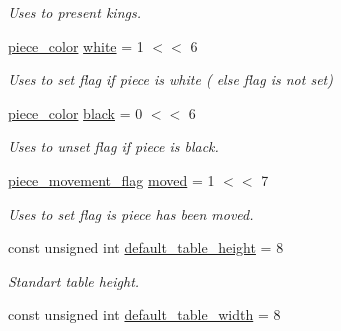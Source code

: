 \begin{DoxyCompactItemize}
\begin{DoxyCompactList}\small\item\em Uses to present kings. \item\end{DoxyCompactList}\item 
\hypertarget{namespaceChEngn_aa3212b290980eb5db7f91e88f8803a9c}{
\hyperlink{namespaceChEngn_a9c81426c0134a97288a226c122daf62f}{piece\_\-color} \hyperlink{namespaceChEngn_aa3212b290980eb5db7f91e88f8803a9c}{white} = 1 $<$$<$ 6}
\label{namespaceChEngn_aa3212b290980eb5db7f91e88f8803a9c}

\begin{DoxyCompactList}\small\item\em Uses to set flag if piece is white ( else flag is not set) \item\end{DoxyCompactList}\item 
\hypertarget{namespaceChEngn_aa2bfc6fe87969d3e28eecbb682e802c8}{
\hyperlink{namespaceChEngn_a9c81426c0134a97288a226c122daf62f}{piece\_\-color} \hyperlink{namespaceChEngn_aa2bfc6fe87969d3e28eecbb682e802c8}{black} = 0 $<$$<$ 6}
\label{namespaceChEngn_aa2bfc6fe87969d3e28eecbb682e802c8}

\begin{DoxyCompactList}\small\item\em Uses to unset flag if piece is black. \item\end{DoxyCompactList}\item 
\hypertarget{namespaceChEngn_a2997c391593541b72a894e9cf44c90bf}{
\hyperlink{namespaceChEngn_a491b2eba2f766087f4f28948005ab16a}{piece\_\-movement\_\-flag} \hyperlink{namespaceChEngn_a2997c391593541b72a894e9cf44c90bf}{moved} = 1 $<$$<$ 7}
\label{namespaceChEngn_a2997c391593541b72a894e9cf44c90bf}

\begin{DoxyCompactList}\small\item\em Uses to set flag is piece has been moved. \item\end{DoxyCompactList}\item 
\hypertarget{namespaceChEngn_ae87757a4f2d9ae9e25d48213cad79ddd}{
const unsigned int \hyperlink{namespaceChEngn_ae87757a4f2d9ae9e25d48213cad79ddd}{default\_\-table\_\-height} = 8}
\label{namespaceChEngn_ae87757a4f2d9ae9e25d48213cad79ddd}

\begin{DoxyCompactList}\small\item\em Standart table height. \item\end{DoxyCompactList}\item 
\hypertarget{namespaceChEngn_a9dc4a83c122aec6e170ad7a1d40efd8a}{
const unsigned int \hyperlink{namespaceChEngn_a9dc4a83c122aec6e170ad7a1d40efd8a}{default\_\-table\_\-width} = 8}
\label{namespaceChEngn_a9dc4a83c122aec6e170ad7a1d40efd8a}


\end{DoxyCompactItemize}
